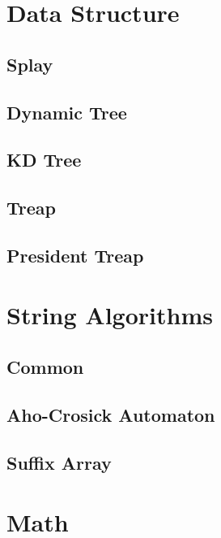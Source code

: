 ﻿\documentclass[10pt]{article}
\begin{document}
\tableofcontents
\newpage

\section{Data Structure}
\subsection{Splay}

\subsection{Dynamic Tree}

\subsection{KD Tree}

\subsection{Treap}

\subsection{President Treap}

\section{String Algorithms}
\subsection{Common}

\subsection{Aho-Crosick Automaton}

\subsection{Suffix Array}

\section{Math}
\end{document}
